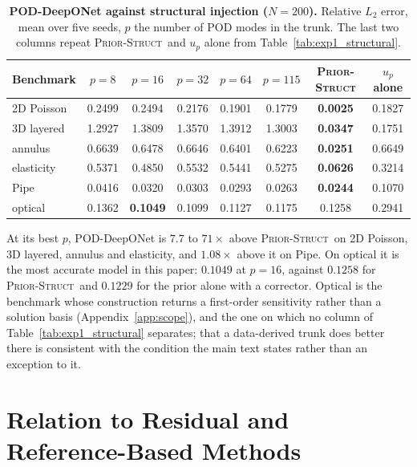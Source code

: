 \documentclass{article}
\newcommand{\armstruct}{\textsc{Prior-Struct}}
\begin{document}
\begin{table}[H]
\centering
\caption{\textbf{POD-DeepONet \citep{lu2022} against structural injection ($N{=}200$).} Relative
$L_2$ error, mean over five seeds, $p$ the number of POD modes in the trunk. The last two columns
repeat \armstruct\ and $u_p$ alone from Table~\ref{tab:exp1_structural}.}
\label{tab:poddon}
\footnotesize
\setlength{\tabcolsep}{7pt}
\renewcommand{\arraystretch}{0.8}
\vspace{1mm}
\begin{tabular}{@{}lccccc cc@{}}
\toprule
Benchmark & $p{=}8$ & $p{=}16$ & $p{=}32$ & $p{=}64$ & $p{=}115$ & \armstruct & $u_p$ alone\\
\midrule
2D Poisson & 0.2499 & 0.2494 & 0.2176 & 0.1901 & 0.1779 & \textbf{0.0025} & 0.1827\\
3D layered & 1.2927 & 1.3809 & 1.3570 & 1.3912 & 1.3003 & \textbf{0.0347} & 0.1751\\
annulus    & 0.6639 & 0.6478 & 0.6646 & 0.6401 & 0.6223 & \textbf{0.0251} & 0.6649\\
elasticity & 0.5371 & 0.4850 & 0.5532 & 0.5441 & 0.5275 & \textbf{0.0626} & 0.3214\\
Pipe       & 0.0416 & 0.0320 & 0.0303 & 0.0293 & 0.0263 & \textbf{0.0244} & 0.1070\\
optical    & 0.1362 & \textbf{0.1049} & 0.1099 & 0.1127 & 0.1175 & 0.1258 & 0.2941\\
\bottomrule
\end{tabular}
\vspace{-3mm}
\end{table}

At its best $p$, POD-DeepONet is $7.7$ to $71\times$ above \armstruct\ on 2D Poisson, 3D layered,
annulus and elasticity, and $1.08\times$ above it on Pipe. On optical it is the most accurate
model in this paper: $0.1049$ at $p{=}16$, against $0.1258$ for \armstruct\ and $0.1229$ for the
prior alone with a corrector. Optical is the benchmark whose construction returns a first-order
sensitivity rather than a solution basis (Appendix~\ref{app:scope}), and the one on which no
column of Table~\ref{tab:exp1_structural} separates; that a data-derived trunk does better there
is consistent with the condition the main text states rather than an exception to it.

\section{Relation to Residual and Reference-Based Methods}
\label{app:related}
\end{document}
